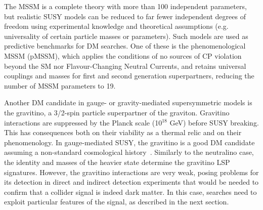 The MSSM is a complete theory with more than 100 independent parameters, 
but realistic SUSY models can be reduced to far fewer independent degrees of freedom using
experimental knowledge and theoretical assumptions (e.g. universality of certain
particle masses or parameters). Such models are used as predictive benchmarks for DM searches. 
One of these is the phenomenological MSSM (pMSSM), which applies the conditions
of no sources of CP violation beyond the SM nor Flavour-Changing Neutral Currents, 
and retains universal couplings and masses for first and second generation superpartners, reducing
the number of MSSM parameters to 19. 

Another DM candidate in gauge- or gravity-mediated supersymmetric models is the gravitino, 
a 3/2-spin particle superpartner of the graviton. 
Gravitino interactions are suppressed by the Planck scale (10$^{18}$ GeV) before SUSY breaking.
This has consequences both on their viability as a thermal relic and on their phenomenology. 
In gauge-mediated SUSY, the gravitino is a good DM candidate assuming a
non-standard cosmological history~\cite{Steffen:2007sp}. 
Similarly to the neutralino case, the identity and masses of the heavier state determine the
gravitino LSP signatures. However, the gravitino interactions are very weak, posing problems for 
its detection in direct and indirect detection experiments that would be needed to confirm that
a collider signal is indeed dark matter. In this case, searches need to exploit
particular features of the signal, as described in the next section. 

